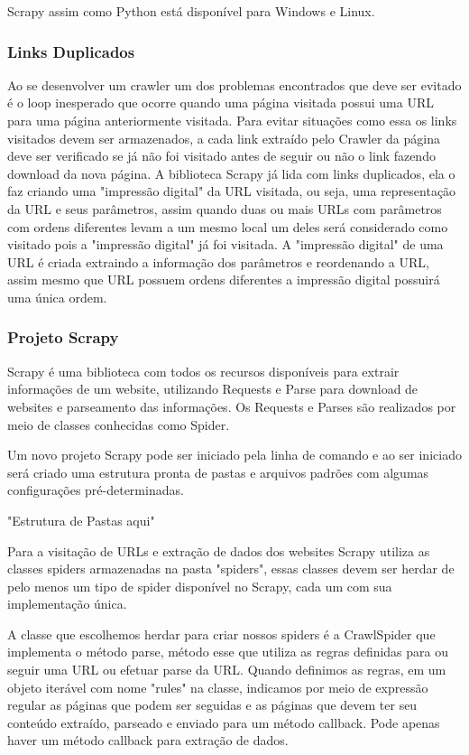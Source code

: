 \documentclass[12pt]{article}
\begin{document}
Scrapy assim como Python está disponível para Windows e Linux.

\subsubsection{Links Duplicados}

Ao se desenvolver um crawler um dos problemas encontrados que deve ser evitado é o loop inesperado que ocorre quando uma página visitada possui uma URL para uma página anteriormente visitada. Para evitar situações como essa os links visitados devem ser armazenados, a cada link extraído pelo Crawler da página deve ser verificado se já não foi visitado antes de seguir ou não o link fazendo download da nova página. 
A biblioteca Scrapy já lida com links duplicados, ela o faz criando uma "impressão digital" da URL visitada, ou seja, uma representação da URL e seus parâmetros, assim quando duas ou mais URLs com parâmetros com ordens diferentes levam a um mesmo local um deles será considerado como visitado pois a "impressão digital" já foi visitada. A "impressão digital" de uma URL é criada extraindo a informação dos parâmetros e reordenando a URL, assim mesmo que URL possuem ordens diferentes a impressão digital possuirá uma única ordem. 

\subsubsection{Projeto Scrapy}

Scrapy é uma biblioteca com todos os recursos disponíveis para extrair informações de um website, utilizando Requests e Parse para download de websites e parseamento das informações. Os Requests e Parses são realizados por meio de classes conhecidas como Spider.

Um novo projeto Scrapy pode ser iniciado pela linha de comando e ao ser iniciado será criado uma estrutura pronta de pastas e arquivos padrões com algumas configurações pré-determinadas.
 
"Estrutura de Pastas aqui"

Para a visitação de URLs e extração de dados dos websites Scrapy utiliza as classes spiders armazenadas na pasta "spiders", essas classes devem ser herdar de pelo menos um tipo de spider disponível no Scrapy, cada um com sua implementação única.

A classe que escolhemos herdar para criar nossos spiders é a CrawlSpider que implementa o método parse, método esse que utiliza as regras definidas para ou seguir uma URL ou efetuar parse da URL. Quando definimos as regras, em um objeto iterável com nome "rules" na classe, indicamos por meio de expressão regular as páginas que podem ser seguidas e as páginas que devem ter seu conteúdo extraído, parseado e enviado para um método callback. Pode apenas haver um método callback para extração de dados.
\end{document}
